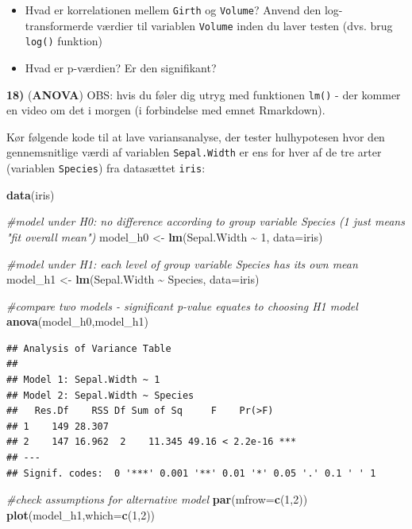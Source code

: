 \documentclass[
]{book}
\newenvironment{Shaded}{\begin{snugshade}}{\end{snugshade}}
\newcommand{\AttributeTok}[1]{\textcolor[rgb]{0.13,0.29,0.53}{#1}}
\newcommand{\CommentTok}[1]{\textcolor[rgb]{0.56,0.35,0.01}{\textit{#1}}}
\newcommand{\DecValTok}[1]{\textcolor[rgb]{0.00,0.00,0.81}{#1}}
\newcommand{\FunctionTok}[1]{\textcolor[rgb]{0.13,0.29,0.53}{\textbf{#1}}}
\newcommand{\NormalTok}[1]{#1}
\newcommand{\OtherTok}[1]{\textcolor[rgb]{0.56,0.35,0.01}{#1}}
\newcommand{\SpecialCharTok}[1]{\textcolor[rgb]{0.81,0.36,0.00}{\textbf{#1}}}
\providecommand{\tightlist}{%
  \setlength{\itemsep}{0pt}\setlength{\parskip}{0pt}}
\theoremstyle{definition}
\theoremstyle{definition}
\theoremstyle{definition}
\theoremstyle{definition}
\theoremstyle{remark}
\begin{document}
\begin{itemize}
\tightlist
\item
  Hvad er korrelationen mellem \texttt{Girth} og \texttt{Volume}? Anvend den log-transformerde værdier til variablen \texttt{Volume} inden du laver testen (dvs. brug \texttt{log()} funktion)
\item
  Hvad er p-værdien? Er den signifikant?
\end{itemize}

\textbf{18)} (\textbf{ANOVA}) OBS: hvis du føler dig utryg med funktionen \texttt{lm()} - der kommer en video om det i morgen (i forbindelse med emnet Rmarkdown).

Kør følgende kode til at lave variansanalyse, der tester hulhypotesen hvor den gennemsnitlige værdi af variablen \texttt{Sepal.Width} er ens for hver af de tre arter (variablen \texttt{Species}) fra datasættet \texttt{iris}:

\begin{Shaded}
\begin{Highlighting}[]
\FunctionTok{data}\NormalTok{(iris)}

\CommentTok{\#model under H0: no difference according to group variable Species (1 just means "fit overall mean")}
\NormalTok{model\_h0 }\OtherTok{\textless{}{-}} \FunctionTok{lm}\NormalTok{(Sepal.Width }\SpecialCharTok{\textasciitilde{}} \DecValTok{1}\NormalTok{, }\AttributeTok{data=}\NormalTok{iris) }

\CommentTok{\#model under H1: each level of group variable Species has its own mean}
\NormalTok{model\_h1 }\OtherTok{\textless{}{-}} \FunctionTok{lm}\NormalTok{(Sepal.Width }\SpecialCharTok{\textasciitilde{}}\NormalTok{ Species, }\AttributeTok{data=}\NormalTok{iris) }

\CommentTok{\#compare two models {-} significant p{-}value equates to choosing H1 model}
\FunctionTok{anova}\NormalTok{(model\_h0,model\_h1)}
\end{Highlighting}
\end{Shaded}

\begin{verbatim}
## Analysis of Variance Table
## 
## Model 1: Sepal.Width ~ 1
## Model 2: Sepal.Width ~ Species
##   Res.Df    RSS Df Sum of Sq     F    Pr(>F)    
## 1    149 28.307                                 
## 2    147 16.962  2    11.345 49.16 < 2.2e-16 ***
## ---
## Signif. codes:  0 '***' 0.001 '**' 0.01 '*' 0.05 '.' 0.1 ' ' 1
\end{verbatim}

\begin{Shaded}
\begin{Highlighting}[]
\CommentTok{\#check assumptions for alternative model}
\FunctionTok{par}\NormalTok{(}\AttributeTok{mfrow=}\FunctionTok{c}\NormalTok{(}\DecValTok{1}\NormalTok{,}\DecValTok{2}\NormalTok{))}
\FunctionTok{plot}\NormalTok{(model\_h1,}\AttributeTok{which=}\FunctionTok{c}\NormalTok{(}\DecValTok{1}\NormalTok{,}\DecValTok{2}\NormalTok{))}
\end{Highlighting}
\end{Shaded}
\end{document}
